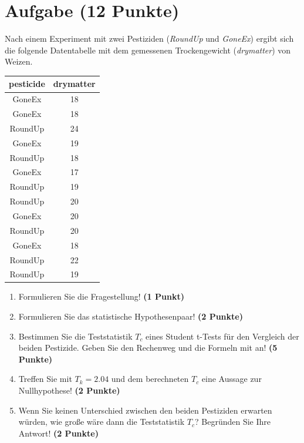 \documentclass[a4paper, 10pt]{scrartcl}\usepackage[]{graphicx}\usepackage[]{xcolor}
\begin{document}
\section{Aufgabe \hfill (12 Punkte)}

Nach einem Experiment mit zwei Pestiziden (\textit{RoundUp} und
\textit{GoneEx}) ergibt sich die folgende Datentabelle mit dem gemessenen
Trockengewicht (\textit{drymatter}) von Weizen.

\begin{table}[!h]
\centering
\begin{tabular}{cc}
\toprule
pesticide & drymatter\\
\midrule
GoneEx & 18\\
GoneEx & 18\\
RoundUp & 24\\
GoneEx & 19\\
RoundUp & 18\\
\addlinespace
GoneEx & 17\\
RoundUp & 19\\
RoundUp & 20\\
GoneEx & 20\\
RoundUp & 20\\
\addlinespace
GoneEx & 18\\
RoundUp & 22\\
RoundUp & 19\\
\bottomrule
\end{tabular}
\end{table}



\begin{enumerate}
  \item Formulieren Sie die Fragestellung! \textbf{(1 Punkt)}
  \item Formulieren Sie das statistische Hypothesenpaar! \textbf{(2
      Punkte)}
  \item Bestimmen Sie die Teststatistik $T_c$ eines Student t-Tests f{\"u}r den
  Vergleich der beiden Pestizide. Geben Sie den Rechenweg und die Formeln
  mit an! \textbf{(5 Punkte)}
\item Treffen Sie mit $T_k = 2.04$ und dem berechneten $T_c$ eine Aussage
  zur Nullhypothese! \textbf{(2 Punkte)}
\item Wenn Sie keinen Unterschied zwischen den beiden Pestiziden erwarten
  w{\"u}rden, wie gro{\ss}e w{\"a}re dann die Teststatistik $T_c$? Begr{\"u}nden Sie Ihre
  Antwort! \textbf{(2 Punkte)}
\end{enumerate} 
\clearpage
\end{document}
